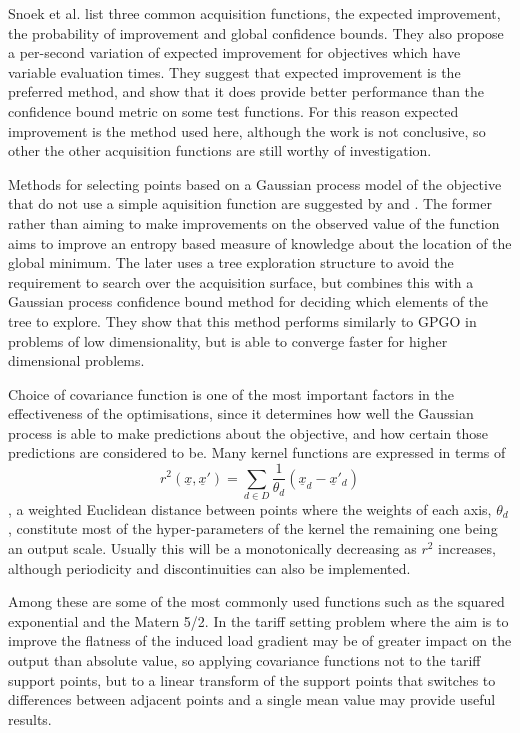 \documentclass[a4paper, 10 pt, conference]{ieeeconf}  %
\begin{document}

Snoek et al. \cite{snoek2012practical} list three common acquisition functions, the expected improvement, the probability of improvement and global confidence bounds. They also propose a per-second variation of expected improvement for objectives which have variable evaluation times. They suggest that expected improvement is the preferred method, and show that it does provide better performance than the confidence bound metric on some test functions. For this reason expected improvement is the method used here, although the work is not conclusive, so other the other acquisition functions are still worthy of investigation.

Methods for selecting points based on a Gaussian process model of the objective that do not use a simple aquisition function are suggested by \cite{hennig2012entropy} and \cite{wang2014bayesian}. The former rather than aiming to make improvements on the observed value of the function aims to improve an entropy based measure of knowledge about the location of the global minimum. The later uses a tree exploration structure to avoid the requirement to search over the acquisition surface, but combines this with a Gaussian process confidence bound method for deciding which elements of the tree to explore. They show that this method performs similarly to GPGO in problems of low dimensionality, but is able to converge faster for higher dimensional problems.

Choice of covariance function is one of the most important factors in the effectiveness of the optimisations, since it determines how well the Gaussian process is able to make predictions about the objective, and how certain those predictions are considered to be. Many kernel functions are expressed in terms of 
\begin{equation}
\label{euclid}
r^{2}(\underline{x},\underline{x}') = \sum_{d \in D}\frac{1}{\theta_{d}}(\underline{x}_{d}-\underline{x}'_{d}) 
\end{equation},
a weighted Euclidean distance between points where the weights of each axis, $\theta_{d}$, constitute most of the hyper-parameters of the kernel the remaining one being an output scale. Usually this will be a monotonically decreasing as $r^{2}$ increases, although periodicity and discontinuities can also be implemented. 

Among these are some of the most commonly used functions such as the squared exponential and the Matern 5/2. In the tariff setting problem where the aim is to improve the flatness of the induced load gradient may be of greater impact on the output than absolute value, so applying covariance functions not to the tariff support points, but to a linear transform of the support points that switches to differences between adjacent points and a single mean value may provide useful results.
\end{document}
